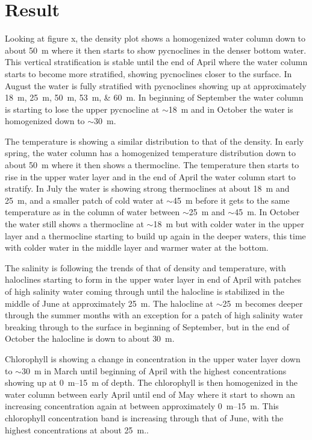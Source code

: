 \documentclass[../Main.tex]{subfiles}
\begin{document}
\section*{\crule[blue]{.3cm}{.3cm} Result}
Looking at figure x, the density plot shows a homogenized water column down to about \SI{50}{\metre} where it then starts to show pycnoclines in the denser bottom water.
 This vertical stratification is stable until the end of April where the water column starts to become more stratified, showing pycnoclines closer to the surface.
In August the water is fully stratified with pycnoclines showing up at approximately \SIlist{18;25;50;53;60}{\metre}. 
In beginning of September the water column is starting to lose the upper pycnocline at $\sim$\SI{18}{\metre} and in October the water is homogenized down to $\sim$\SI{30}{\metre}.

The temperature is showing a similar distribution to that of the density. 
In early spring, the water column has a homogenized temperature distribution down to about \SI{50}{\metre} where it then shows a thermocline. 
The temperature then starts to rise in the upper water layer and in the end of April the water column start to stratify. 
In July the water is showing strong thermoclines at about \SI{18}{\metre} and \SI{25}{\metre}, and a smaller patch of cold water at $\sim$\SI{45}{\metre} before it gets to the same temperature as in the column of water between $\sim$\SI{25}{\metre} and $\sim$\SI{45}{\metre}. 
In October the water still shows a thermocline at $\sim$\SI{18}{\metre} but with colder water in the upper layer and a thermocline starting to build up again in the deeper waters, this time with colder water in the middle layer and warmer water at the bottom. 

The salinity is following the trends of that of density and temperature, with haloclines starting to form in the upper water layer in end of April with patches of high salinity water coming through until the halocline is stabilized in the middle of June at approximately \SI{25}{\metre}. 
The halocline at $\sim$\SI{25}{\metre} becomes deeper through the summer months with an exception for a patch of high salinity water breaking through to the surface in beginning of September, but in the end of October the halocline is down to about \SI{30}{\metre}. 

Chlorophyll is showing a change in concentration in the upper water layer down to $\sim$\SI{30}{\metre} in March until beginning of April with the highest concentrations showing up at \SIrange{0}{15}{\metre} of depth. 
The chlorophyll is then homogenized in the water column between early April until end of May where it start to shown an increasing concentration again at between approximately \SIrange{0}{15}{\metre}. 
This chlorophyll concentration band is increasing through that of June, with the highest concentrations at about \SI{25}{\metre}..
\end{document}
